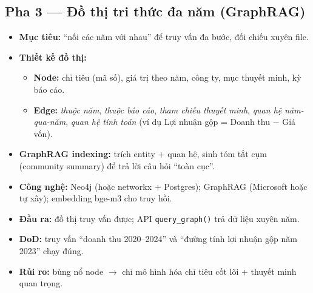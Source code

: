 \documentclass[11pt,a4paper]{article}
\newcommand{\pha}[1]{\subsection{#1}}
\begin{document}
\pha{Pha 3 --- Đồ thị tri thức đa năm (GraphRAG)}
\begin{itemize}
  \item \textbf{Mục tiêu:} ``nối các năm với nhau'' để truy vấn đa bước, đối chiếu xuyên file.
  \item \textbf{Thiết kế đồ thị:}
  \begin{itemize}
    \item \textbf{Node:} chỉ tiêu (mã số), giá trị theo năm, công ty, mục thuyết minh, kỳ báo cáo.
    \item \textbf{Edge:} \emph{thuộc năm}, \emph{thuộc báo cáo}, \emph{tham chiếu thuyết minh}, \emph{quan hệ năm-qua-năm}, \emph{quan hệ tính toán} (ví dụ Lợi nhuận gộp = Doanh thu $-$ Giá vốn).
  \end{itemize}
  \item \textbf{GraphRAG indexing:} trích entity + quan hệ, sinh tóm tắt cụm (community summary) để trả lời câu hỏi ``toàn cục''.
  \item \textbf{Công nghệ:} Neo4j (hoặc networkx + Postgres); GraphRAG (Microsoft hoặc tự xây); embedding bge-m3 cho truy hồi.
  \item \textbf{Đầu ra:} đồ thị truy vấn được; API \texttt{query\_graph()} trả dữ liệu xuyên năm.
  \item \textbf{DoD:} truy vấn ``doanh thu 2020--2024'' và ``đường tính lợi nhuận gộp năm 2023'' chạy đúng.
  \item \textbf{Rủi ro:} bùng nổ node $\rightarrow$ chỉ mô hình hóa chỉ tiêu cốt lõi + thuyết minh quan trọng.
\end{itemize}
\end{document}
